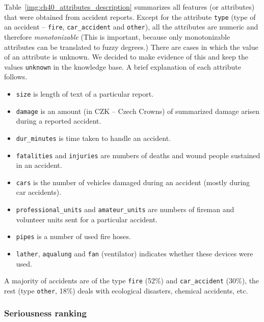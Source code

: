 Table~\ref{img:ch40_attributes_description} summarizes all features (or attributes) that were obtained from accident reports. Except for the attribute \verb+type+ (type of an accident -- \verb+fire+, \verb+car_accident+ and \verb+other+), all the attributes are numeric and therefore \emph{monotonizable} (This is important, because only monotonizable attributes can be translated to fuzzy degrees.) There are cases in which the value of an attribute is unknown. We decided to make evidence of this and keep the values \verb+unknown+ in the knowledge base. A brief explanation of each attribute follows.
\begin{itemize}
	\item \verb+size+ is length of text of a particular report.
	\item \verb+damage+ is an amount (in CZK -- Czech Crowns) of summarized damage arisen during a reported accident.
	\item \verb+dur_minutes+ is time taken to handle an accident.
	\item \verb+fatalities+ and \verb+injuries+ are numbers of deaths and wound people sustained in an accident.
	\item \verb+cars+ is the number of vehicles damaged during an accident (mostly during car accidents).
	\item \verb+professional_units+ and \verb+amateur_units+ are numbers of fireman and volunteer units sent for a particular accident.
	\item \verb+pipes+ is a number of used fire hoses.
	\item \verb+lather+, \verb+aqualung+ and \verb+fan+ (ventilator) indicates whether these devices were used.
\end{itemize}

A majority of accidents are of the type \verb+fire+ (52\%)
and \verb+car_accident+ (30\%),
the rest (type \verb+other+, 18\%)
deals with ecological disasters, chemical accidents, etc.

\subsubsection{Seriousness ranking} \label{sec:ch40_seriousness}



